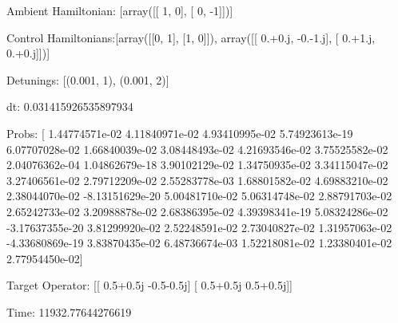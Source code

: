 \documentclass{article}
\begin{document}
    

\newpage

Ambient Hamiltonian: [array([[ 1,  0],
       [ 0, -1]])]

Control Hamiltonians:[array([[0, 1],
       [1, 0]]), array([[ 0.+0.j, -0.-1.j],
       [ 0.+1.j,  0.+0.j]])]

Detunings: [(0.001, 1), (0.001, 2)]

 dt: 0.031415926535897934

Probs: [  1.44774571e-02   4.11840971e-02   4.93410995e-02   5.74923613e-19
   6.07707028e-02   1.66840039e-02   3.08448493e-02   4.21693546e-02
   3.75525582e-02   2.04076362e-04   1.04862679e-18   3.90102129e-02
   1.34750935e-02   3.34115047e-02   3.27406561e-02   2.79712209e-02
   2.55283778e-03   1.68801582e-02   4.69883210e-02   2.38044070e-02
  -8.13151629e-20   5.00481710e-02   5.06314748e-02   2.88791703e-02
   2.65242733e-02   3.20988878e-02   2.68386395e-02   4.39398341e-19
   5.08324286e-02  -3.17637355e-20   3.81299920e-02   2.52248591e-02
   2.73040827e-02   1.31957063e-02  -4.33680869e-19   3.83870435e-02
   6.48736674e-03   1.52218081e-02   1.23380401e-02   2.77954450e-02]

Target Operator: [[ 0.5+0.5j -0.5-0.5j]
 [ 0.5+0.5j  0.5+0.5j]]

Time: 11932.77644276619
\end{document}
